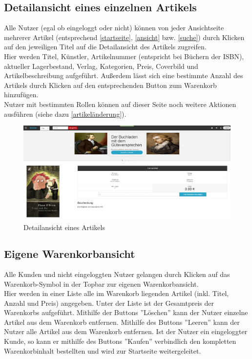 \documentclass[a4paper]{article}
\begin{document}
\FloatBarrier

\subsection{Detailansicht eines einzelnen Artikels} \label{detail}

Alle Nutzer (egal ob eingeloggt oder nicht) können von jeder Ansichtseite mehrerer Artikel (entsprechend \ref{startseite}, \ref{ansicht} bzw. \ref{suche}) durch Klicken auf den jeweiligen Titel auf die Detailansicht des Artikels zugreifen. \\
Hier werden Titel, Künstler, Artikelnummer (entspricht bei Büchern der ISBN), aktueller Lagerbestand, Verlag, Kategorien, Preis, Coverbild und Artikelbeschreibung aufgeführt. Außerdem lässt sich eine bestimmte Anzahl des Artikels durch Klicken auf den entsprechenden Button zum Warenkorb hinzufügen. \\
Nutzer mit bestimmten Rollen können auf dieser Seite noch weitere Aktionen ausführen (siehe dazu \ref{artikeländerung}).

\begin{figure}[ht]
\centering
\includegraphics[width=1.0\textwidth]{Artikeldetail.jpg}
\caption{Detailansicht eines Artikels}
\end{figure}
\smallskip

\FloatBarrier

\subsection{Eigene Warenkorbansicht}

Alle Kunden und nicht eingeloggten Nutzer gelangen durch Klicken auf das Warenkorb-Symbol in der Topbar zur eigenen Warenkorbansicht. \\
Hier werden in einer Liste alle im Warenkorb liegenden Artikel (inkl. Titel, Anzahl und Preis) angegeben. Unter der Liste ist der Gesamtpreis der Warenkorbs aufgeführt. Mithilfe der Buttons ''Löschen'' kann der Nutzer einzelne Artikel aus dem Warenkorb entfernen. Mithilfe des Buttons ''Leeren'' kann der Nutzer alle Artikel aus dem Warenkorb entfernen. Ist der Nutzer ein eingeloggter Kunde, so kann er mithilfe des Buttons ''Kaufen'' verbindlich den kompletten Warenkorbinhalt bestellten und wird zur Startseite weitergeleitet. 
\end{document}
